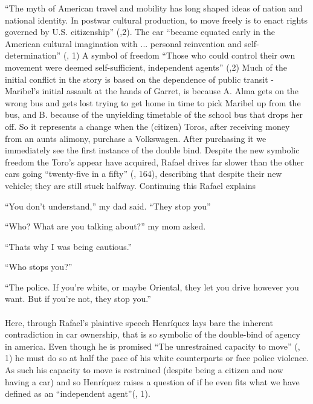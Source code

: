 \documentclass{article}
\begin{document}
``The myth of American travel and mobility has long shaped ideas of nation and national identity. In postwar cultural production, to move freely is to enact rights governed by U.S. citizenship'' (\cite{ruiz2015transit},2). The car ``became equated early in the American cultural imagination with ... personal reinvention and self-determination'' (\cite{Uhlman2015-qx}, 1) A symbol of freedom ``Those who could control their own movement were deemed self-sufficient, independent agents'' (\cite{Uhlman2015-qx},2) Much of the initial conflict in the story is based on the dependence of public transit - Maribel's initial assault at the hands of Garret, is because A. Alma gets on the wrong bus and gets lost trying to get home in time to pick Maribel up from the bus, and B. because of the unyielding timetable of the school bus that drops her off. So it represents a change when the (citizen) Toros, after receiving money from an aunts alimony, purchase a Volkswagen. After purchasing it we immediately see the first instance of the double bind. Despite the new symbolic freedom the Toro's appear have acquired, Rafael drives far slower than the other cars going ``twenty-five in a fifty'' (\cite{Henriquez2014-sh}, 164), describing that despite their new vehicle; they are still stuck halfway. Continuing this Rafael explains


``You don't understand,'' my dad said. ``They stop you''

``Who? What are you talking about?'' my mom asked.

``Thats why I was being cautious.''

``Who stops you?''

``The police. If you're white, or maybe Oriental, they let you drive however you want. But if you're not, they stop you.''
\paragraph{}
Here, through Rafael's plaintive speech Henríquez lays bare the inherent contradiction in car ownership, that is so symbolic of the double-bind of agency in america. Even though he is promised ``The unrestrained capacity to move'' (\cite{Uhlman2015-qx}, 1) he must do so at half the pace of his white counterparts or face police violence. As such his capacity to move is restrained (despite being a citizen and now having a car) and so Henríquez raises a question of if he even fits what we have defined as an ``independent agent''(\cite{Uhlman2015-qx}, 1).
\end{document}
